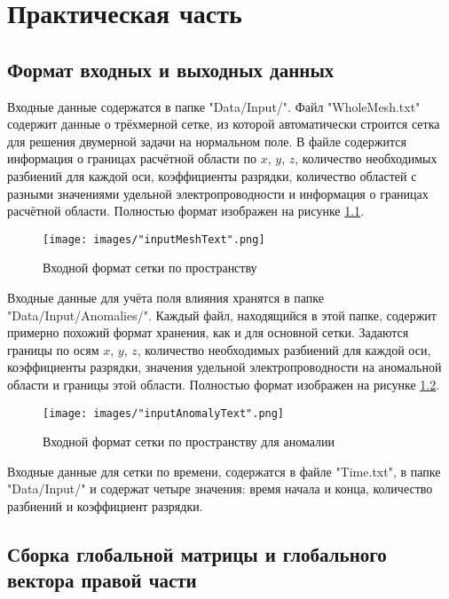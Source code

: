 \chapter{Практическая часть}

\section{Формат входных и выходных данных}

Входные данные содержатся в папке "Data/Input/". Файл "WholeMesh.txt" содержит данные о трёхмерной сетке, из которой автоматически строится сетка для решения двумерной задачи на нормальном поле. В файле содержится информация о границах расчётной  области по $x$, $y$, $z$, количество необходимых разбиений для каждой оси, коэффициенты разрядки, количество областей с разными значениями удельной электропроводности и информация о границах расчётной области. Полностью формат изображен на рисунке \ref{fig:TextWholeMesh}.

\begin{figure}
	\centering
	\texttt{[image: images/"inputMeshText".png]}
	\caption{Входной формат сетки по пространству}
	\label{fig:TextWholeMesh}
\end{figure}

Входные данные для учёта поля влияния хранятся в папке "Data/Input/Anomalies/". Каждый файл, находящийся в этой папке, содержит примерно похожий формат хранения, как и для основной сетки. Задаются границы по осям $x$, $y$, $z$, количество необходимых разбиений для каждой оси, коэффициенты разрядки, значения удельной электропроводности на аномальной области и границы этой области. Полностью формат изображен на рисунке \ref{fig:TextAnomalyMesh}.

\begin{figure}
	\centering
	\texttt{[image: images/"inputAnomalyText".png]}
	\caption{Входной формат сетки по пространству для аномалии}
	\label{fig:TextAnomalyMesh}
\end{figure}

Входные данные для сетки по времени, содержатся в файле "Time.txt", в папке "Data/Input/" и содержат четыре значения: время начала и конца, количество разбиений и коэффициент разрядки.

\section{Сборка глобальной матрицы и глобального вектора правой части}

